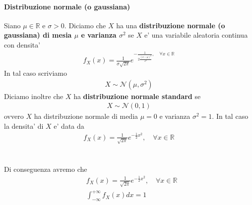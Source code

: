 \documentclass[a4paper,12pt]{article}
\begin{document}
\paragraph{Distribuzione normale (o gaussiana)} Siano $\mu \in \mathbb{R}$ e $\sigma > 0$. Diciamo che $X$ ha una \textbf{distribuzione normale (o gaussiana) di mesia $\mu$ e varianza $\sigma^2$} se $X$ e' una variabile aleatoria continua con densita'
\begin{align*}
  f_X (x) = \frac{1}{\sigma \sqrt{2 \pi}} e^{- \frac{1}{2\frac{(x-\mu)^2}{\sigma^2}}, \quad \forall x \in \mathbb{R}}
\end{align*}
In tal caso scriviamo
\begin{align*}
  X \sim \mathcal{N}(\mu, \sigma^2)
\end{align*}
Diciamo inoltre che $X$ ha \textbf{distribuzione normale standard} se 
\begin{align*}
  X \sim \mathcal{N}(0,1)
\end{align*}
ovvero $X$ ha distribuzione normale di media $\mu=0$ e varianza $\sigma^2 = 1$. In tal caso la densita' di $X$ e' data da 
\begin{align*}
  f_X (x) = \frac{1}{\sqrt{2\pi}}e^{-\frac{1}{2}x^2}, \quad \forall x\in \mathbb{R}
\end{align*}
\\
\vspace{1px}\\
Di conseguenza avremo che 
\begin{align*}
  &   f_X (x) = \frac{1}{\sqrt{2\pi}}e^{-\frac{1}{2}x^2}, \quad \forall x\in \mathbb{R}\\
  & \int_{-\infty}^{+\infty} f_X (x) dx = 1
\end{align*}
\vspace{1px}\\
\\
\vspace{1px}\\
\end{document}
